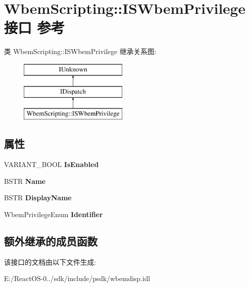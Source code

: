 \hypertarget{interface_wbem_scripting_1_1_i_s_wbem_privilege}{}\section{Wbem\+Scripting\+:\+:I\+S\+Wbem\+Privilege接口 参考}
\label{interface_wbem_scripting_1_1_i_s_wbem_privilege}
类 Wbem\+Scripting\+:\+:I\+S\+Wbem\+Privilege 继承关系图\+:\begin{figure}[H]
\begin{center}
\leavevmode
\includegraphics[height=3.000000cm]{interface_wbem_scripting_1_1_i_s_wbem_privilege}
\end{center}
\end{figure}
\subsection*{属性}
\begin{DoxyCompactItemize}
\item 
\mbox{\label{interface_wbem_scripting_1_1_i_s_wbem_privilege_a23162981e1d78fd88f459a50e4d66a72}} 
V\+A\+R\+I\+A\+N\+T\+\_\+\+B\+O\+OL {\bfseries Is\+Enabled}
\item 
\mbox{\label{interface_wbem_scripting_1_1_i_s_wbem_privilege_a951bcb19fca351c8b3a5c1ad3b15eab9}} 
B\+S\+TR {\bfseries Name}
\item 
\mbox{\label{interface_wbem_scripting_1_1_i_s_wbem_privilege_ac8141040778925523ded7c6352dd1cfd}} 
B\+S\+TR {\bfseries Display\+Name}
\item 
\mbox{\label{interface_wbem_scripting_1_1_i_s_wbem_privilege_aa7ac91bb3bda18732b5356a89d8350cc}} 
Wbem\+Privilege\+Enum {\bfseries Identifier}
\end{DoxyCompactItemize}
\subsection*{额外继承的成员函数}


该接口的文档由以下文件生成\+:\begin{DoxyCompactItemize}
\item 
E\+:/\+React\+O\+S-\/0../sdk/include/psdk/wbemdisp.\+idl\end{DoxyCompactItemize}
